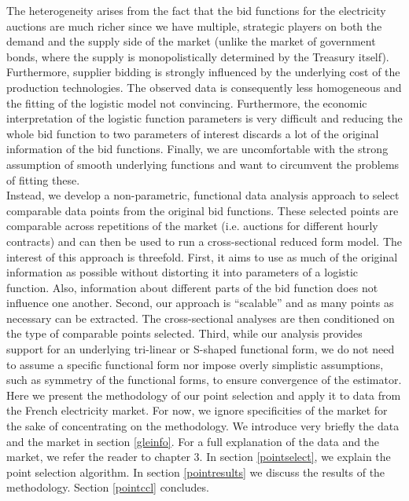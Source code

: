 The heterogeneity arises from the fact that the bid functions for the electricity auctions are much richer since we have multiple, strategic players on both the demand and the supply side of the market (unlike the market of government bonds, where the supply is monopolistically determined by the Treasury itself). Furthermore, supplier bidding is strongly influenced by the underlying cost of the production technologies. The observed data is consequently less homogeneous and the fitting of the logistic model not convincing. Furthermore, the economic interpretation of the logistic function parameters is very difficult and reducing the whole bid function to two parameters of interest discards a lot of the original information of the bid functions. Finally, we are uncomfortable with the strong assumption of smooth underlying functions and want to circumvent the problems of fitting these.\\

Instead, we develop a non-parametric, functional data analysis approach to select comparable data points from the original bid functions. These selected points are comparable across repetitions of the market (i.e. auctions for different hourly contracts) and can then be used to run a cross-sectional reduced form model. The interest of this approach is threefold. First, it aims to use as much of the original information as possible without distorting it into parameters of a logistic function. Also, information about different parts of the bid function does not influence one another. Second, our approach is “scalable” and as many points as necessary can be extracted. The cross-sectional analyses are then conditioned on the type of comparable points selected. Third, while our analysis provides support for an underlying tri-linear or S-shaped functional form, we do not need to assume a specific functional form nor impose overly simplistic assumptions, such as symmetry of the functional forms, to ensure convergence of the estimator.\\

Here we present the methodology of our point selection and apply it to data from the French electricity market. For now, we ignore specificities of the market for the sake of concentrating on the methodology. We introduce very briefly the data and the market in section \ref{gleinfo}. For a full explanation of the data and the market, we refer the reader to chapter 3. In section \ref{pointselect}, we explain the point selection algorithm. In section \ref{pointresults} we discuss the results of the methodology. Section \ref{pointccl} concludes.

